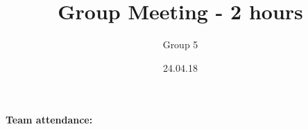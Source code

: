 \documentclass{article}
\title{Group Meeting - 2 hours}
\author{Group 5}
\date{24.04.18}
\begin{document}
	\maketitle
	\noindent
	\textbf{Team attendance:}   \\

	\noindent
\end{document}
